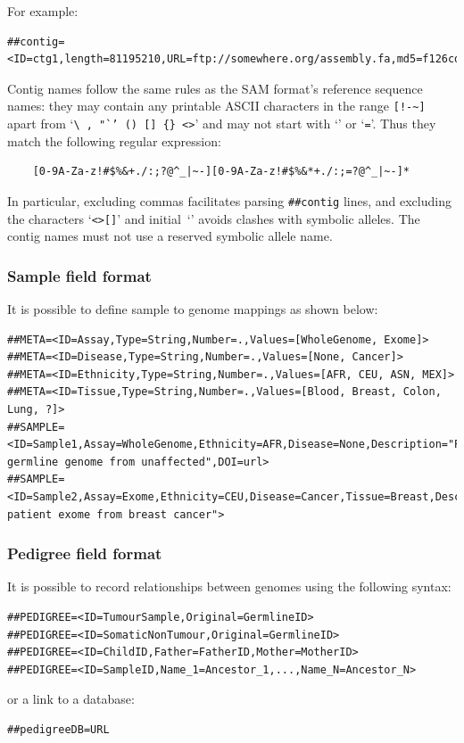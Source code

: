 \documentclass[8pt]{article}
\begin{document}
For example:
{\scriptsize
\begin{verbatim}
##contig=<ID=ctg1,length=81195210,URL=ftp://somewhere.org/assembly.fa,md5=f126cdf8a6e0c7f379d618ff66beb2da,...>
\end{verbatim}
}
\noindent
Contig names follow the same rules as the SAM format's reference sequence names:
they may contain any printable ASCII characters in the range \verb|[!-~]| apart from `{\tt\verb|\|\,,\,"`'\,()\,[]\,\verb|{}|\,<>}' and may not start with `{\tt *}' or `{\tt =}'.
Thus they match the following regular expression:
\begin{verbatim}
    [0-9A-Za-z!#$%&+./:;?@^_|~-][0-9A-Za-z!#$%&*+./:;=?@^_|~-]*
\end{verbatim}
\noindent
In particular, excluding commas facilitates parsing \verb|##contig| lines, and excluding the characters `\verb|<>[]|' and initial~`{\tt *}' avoids clashes with symbolic alleles.
The contig names must not use a reserved symbolic allele name.


\subsubsection{Sample field format}
It is possible to define sample to genome mappings as shown below:
{\scriptsize
\begin{verbatim}
##META=<ID=Assay,Type=String,Number=.,Values=[WholeGenome, Exome]>
##META=<ID=Disease,Type=String,Number=.,Values=[None, Cancer]>
##META=<ID=Ethnicity,Type=String,Number=.,Values=[AFR, CEU, ASN, MEX]>
##META=<ID=Tissue,Type=String,Number=.,Values=[Blood, Breast, Colon, Lung, ?]>
##SAMPLE=<ID=Sample1,Assay=WholeGenome,Ethnicity=AFR,Disease=None,Description="Patient germline genome from unaffected",DOI=url>
##SAMPLE=<ID=Sample2,Assay=Exome,Ethnicity=CEU,Disease=Cancer,Tissue=Breast,Description="European patient exome from breast cancer">
\end{verbatim}}

\subsubsection{Pedigree field format}
It is possible to record relationships between genomes using the following syntax:
\begin{verbatim}
##PEDIGREE=<ID=TumourSample,Original=GermlineID>
##PEDIGREE=<ID=SomaticNonTumour,Original=GermlineID>
##PEDIGREE=<ID=ChildID,Father=FatherID,Mother=MotherID>
##PEDIGREE=<ID=SampleID,Name_1=Ancestor_1,...,Name_N=Ancestor_N>
\end{verbatim}
\noindent or a link to a database:
\begin{verbatim}
##pedigreeDB=URL
\end{verbatim}
\end{document}
